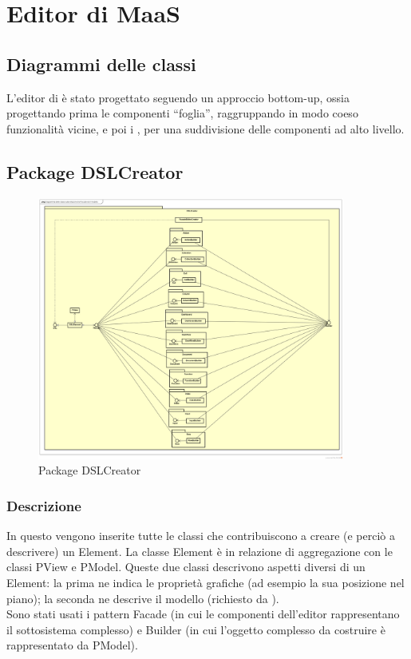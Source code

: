 \section{Editor di MaaS}
        \subsection{Diagrammi delle classi}
        L'editor di  è stato progettato seguendo un approccio bottom-up, ossia progettando prima le componenti ``foglia'', raggruppando in modo coeso funzionalità vicine, e poi i , per una suddivisione delle componenti ad alto livello.
        \subsection{Package DSLCreator}
        \begin{figure}[H]
          \centering
          \includegraphics[width=0.9\textwidth]{res/img/diagram_facade.png}
          \caption{Package DSLCreator}
          \label{fig:diagram_model}
        \end{figure}
        \subsubsection{Descrizione}
        In questo  vengono inserite tutte le classi che contribuiscono a creare (e perciò a descrivere) un  Element. La classe  Element è in relazione di aggregazione con le classi PView e PModel. Queste due classi descrivono aspetti diversi di un  Element: la prima ne indica le proprietà grafiche (ad esempio la sua posizione nel piano); la seconda ne descrive il modello (richiesto da ).\\
        Sono stati usati i pattern Facade (in cui le componenti dell'editor rappresentano il sottosistema complesso) e Builder (in cui l'oggetto complesso da costruire è rappresentato da PModel).

